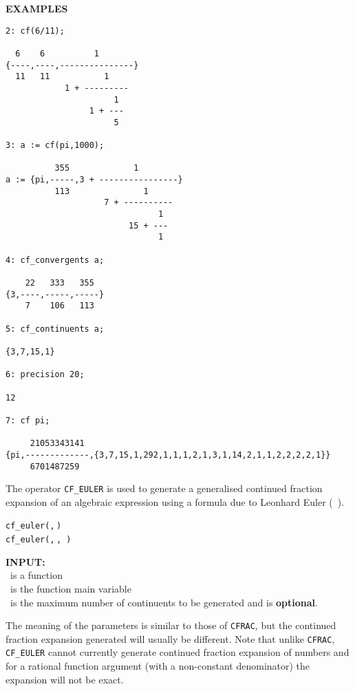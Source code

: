 {\large\textbf{EXAMPLES}}
\begin{verbatim}
2: cf(6/11);

  6    6          1
{----,----,---------------}
  11   11           1
            1 + ---------
                      1
                 1 + ---
                      5

3: a := cf(pi,1000);

          355             1
a := {pi,-----,3 + ----------------}
          113               1
                    7 + ----------
                               1
                         15 + ---
                               1

4: cf_convergents a;

    22   333   355
{3,----,-----,-----}
    7    106   113

5: cf_continuents a;

{3,7,15,1}

6: precision 20;

12

7: cf pi;

     21053343141
{pi,-------------,{3,7,15,1,292,1,1,1,2,1,3,1,14,2,1,1,2,2,2,2,1}}
     6701487259
\end{verbatim}

\hypertarget{CF_EULER:operator}{}
The operator \texttt{CF\_EULER} is used to generate a generalised
continued fraction expansion of an algebraic expression using a formula due to
Leonhard Euler (~\cite{Euler:1748}).
\begin{syntaxtable}
  \texttt{cf\_euler(}\texttt{,}\,\texttt{)}\\
  \texttt{cf\_euler(}\texttt{,}\,\texttt{,}\,%
    \texttt{)}
\end{syntaxtable}


\textbf{INPUT:}\\
\ is a function\\
 \ is the function main variable\\
 \ is the maximum number of continuents to be generated
and is \textbf{optional}.

The meaning of the parameters is similar to those of \texttt{CFRAC}, but the
continued fraction expansion generated will usually be different. Note that
unlike \texttt{CFRAC}, \texttt{CF\_EULER} cannot currently generate
continued fraction expansion of numbers and for a rational function argument
(with a non-constant denominator) the expansion will not be exact.

